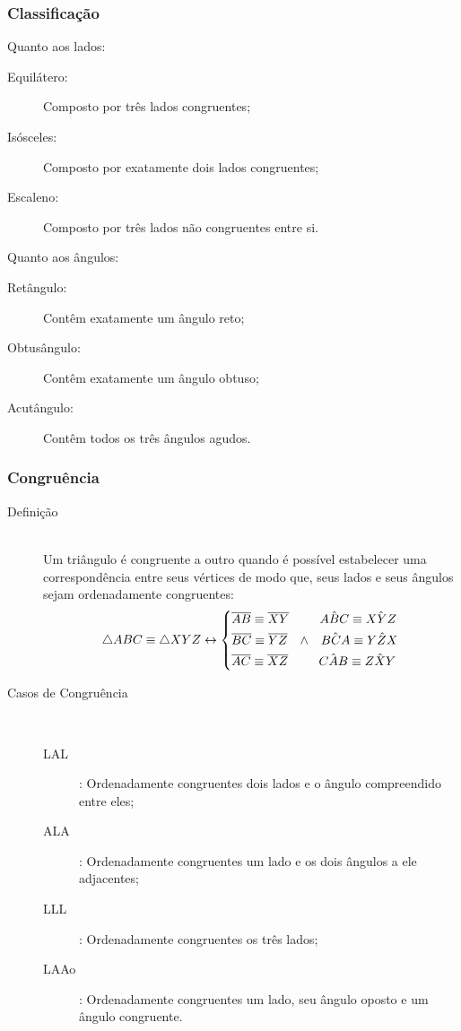    \subsubsection{Classificação}
        Quanto aos lados:
        \begin{description}
            \item[Equilátero:] Composto por três lados congruentes;
            \item[Isósceles:] Composto por exatamente dois lados congruentes;
            \item[Escaleno:] Composto por três lados não congruentes entre si.
        \end{description}
        
        Quanto aos ângulos:
        \begin{description}
            \item[Retângulo:] Contêm exatamente um ângulo reto;
            \item[Obtusângulo:] Contêm exatamente um ângulo obtuso;
            \item[Acutângulo:] Contêm todos os três ângulos agudos.
        \end{description}
    \subsubsection{Congruência}
        \begin{description}
            \item[Definição] \hfill \\
                Um triângulo é congruente a outro quando é possível estabelecer uma correspondência entre seus vértices de modo que, seus lados e seus ângulos sejam ordenadamente congruentes:
                \[ \triangle ABC \equiv \triangle XYZ \leftrightarrow \begin{dcases} \overline{AB} \equiv \overline{XY} \hphantom{-} \hphantom{"^"} \hphantom{-} \hat{ABC} \equiv \hat{XYZ} \\ \overline{BC} \equiv \overline{YZ} \hphantom{-} \wedge \hphantom{-} \hat{BCA} \equiv \hat{YZX} \\ \overline{AC} \equiv \overline{XZ} \hphantom{-} \hphantom{"^"} \hphantom{-} \hat{CAB} \equiv \hat{ZXY} \end{dcases} \]
            \item[Casos de Congruência] \hfill \\
                \begin{description}
                    \item[LAL]: Ordenadamente congruentes dois lados e o ângulo compreendido entre eles;
                    \item[ALA]: Ordenadamente congruentes um lado e os dois ângulos a ele adjacentes;
                    \item[LLL]: Ordenadamente congruentes os três lados;
                    \item[LAAo]: Ordenadamente congruentes um lado, seu ângulo oposto e um ângulo congruente.
                \end{description}
        \end{description}
